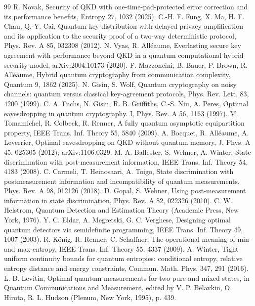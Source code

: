 \documentclass[aps,pra,twocolumn,superscriptaddress,nofootinbib]{revtex4-2}
\begin{document}
\begin{thebibliography}{99}
 R. Novak, Security of QKD with one-time-pad-protected error correction and its performance benefits, Entropy 27, 1032 (2025).
 C.-H. F. Fung, X. Ma, H. F. Chau, Q.-Y. Cai, Quantum key distribution with delayed privacy amplification and its application to the security proof of a two-way deterministic protocol, Phys. Rev. A 85, 032308 (2012).
 N. Vyas, R. Alléaume, Everlasting secure key agreement with performance beyond QKD in a quantum computational hybrid security model, arXiv:2004.10173 (2020).
 F. Mazzoncini, B. Bauer, P. Brown, R. Alléaume, Hybrid quantum cryptography from communication complexity, Quantum 9, 1862 (2025).
 N. Gisin, S. Wolf, Quantum cryptography on noisy channels: quantum versus classical key-agreement protocols, Phys. Rev. Lett. 83, 4200 (1999).
 C. A. Fuchs, N. Gisin, R. B. Griffiths, C.-S. Niu, A. Peres, Optimal eavesdropping in quantum cryptography. I, Phys. Rev. A 56, 1163 (1997).
 M. Tomamichel, R. Colbeck, R. Renner, A fully quantum asymptotic equipartition property, IEEE Trans. Inf. Theory 55, 5840 (2009).
 A. Bocquet, R. Alléaume, A. Leverrier, Optimal eavesdropping on QKD without quantum memory, J. Phys. A 45, 025305 (2012); arXiv:1106.0329.
 M. A. Ballester, S. Wehner, A. Winter, State discrimination with post-measurement information, IEEE Trans. Inf. Theory 54, 4183 (2008).
 C. Carmeli, T. Heinosaari, A. Toigo, State discrimination with postmeasurement information and incompatibility of quantum measurements, Phys. Rev. A 98, 012126 (2018).
 D. Gopal, S. Wehner, Using post-measurement information in state discrimination, Phys. Rev. A 82, 022326 (2010).
 C. W. Helstrom, Quantum Detection and Estimation Theory (Academic Press, New York, 1976).
 Y. C. Eldar, A. Megretski, G. C. Verghese, Designing optimal quantum detectors via semidefinite programming, IEEE Trans. Inf. Theory 49, 1007 (2003).
 R. König, R. Renner, C. Schaffner, The operational meaning of min- and max-entropy, IEEE Trans. Inf. Theory 55, 4337 (2009).
 A. Winter, Tight uniform continuity bounds for quantum entropies: conditional entropy, relative entropy distance and energy constraints, Commun. Math. Phys. 347, 291 (2016).
 L. B. Levitin, Optimal quantum measurements for two pure and mixed states, in Quantum Communications and Measurement, edited by V. P. Belavkin, O. Hirota, R. L. Hudson (Plenum, New York, 1995), p. 439.

\end{thebibliography}
\end{document}
